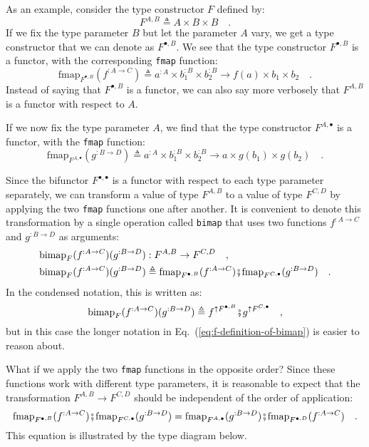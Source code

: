 As an example, consider the type constructor $F$ defined by:
\[
F^{A,B}\triangleq A\times B\times B\quad.
\]
If we fix the type parameter $B$ but let the parameter $A$ vary,
we get a type constructor that we can denote as $F^{\bullet,B}$.
We see that the type constructor $F^{\bullet,B}$ is a functor, with
the corresponding \lstinline!fmap! function:
\[
\text{fmap}_{F^{\bullet,B}}(f^{:A\rightarrow C})\triangleq a^{:A}\times b_{1}^{:B}\times b_{2}^{:B}\rightarrow f(a)\times b_{1}\times b_{2}\quad.
\]
Instead of saying that $F^{\bullet,B}$ is a functor, we can also
say more verbosely that $F^{A,B}$ is a functor with respect to $A$. 

If we now fix the type parameter $A$, we find that the type constructor
$F^{A,\bullet}$ is a functor, with the \lstinline!fmap! function:
\[
\text{fmap}_{F^{A,\bullet}}(g^{:B\rightarrow D})\triangleq a^{:A}\times b_{1}^{:B}\times b_{2}^{:B}\rightarrow a\times g(b_{1})\times g(b_{2})\quad.
\]

Since the bifunctor $F^{\bullet,\bullet}$ is a functor with respect
to each type parameter separately, we can transform a value of type
$F^{A,B}$ to a value of type $F^{C,D}$ by applying the two \lstinline!fmap!
functions one after another. It is convenient to denote this transformation
by a single operation called \lstinline!bimap! that uses two functions
$f^{:A\rightarrow C}$ and $g^{:B\rightarrow D}$ as arguments:
\begin{align}
\text{bimap}_{F}(f^{:A\rightarrow C})(g^{:B\rightarrow D}) & :F^{A,B}\rightarrow F^{C,D}\quad,\nonumber \\
\text{bimap}_{F}(f^{:A\rightarrow C})(g^{:B\rightarrow D}) & \triangleq\text{fmap}_{F^{\bullet,B}}(f^{:A\rightarrow C})\bef\text{fmap}_{F^{C,\bullet}}(g^{:B\rightarrow D})\quad.\label{eq:f-definition-of-bimap}
\end{align}
In the condensed notation, this is written as:
\[
\text{bimap}_{F}(f^{:A\rightarrow C})(g^{:B\rightarrow D})\triangleq f^{\uparrow F^{\bullet,B}}\bef g^{\uparrow F^{C,\bullet}}\quad,
\]
but in this case the longer notation in Eq.~(\ref{eq:f-definition-of-bimap})
is easier to reason about. 

What if we apply the two \lstinline!fmap! functions in the opposite
order? Since these functions work with different type parameters,
it is reasonable to expect that the transformation $F^{A,B}\rightarrow F^{C,D}$
should be independent of the order of application:
\begin{equation}
\text{fmap}_{F^{\bullet,B}}(f^{:A\rightarrow C})\bef\text{fmap}_{F^{C,\bullet}}(g^{:B\rightarrow D})=\text{fmap}_{F^{A,\bullet}}(g^{:B\rightarrow D})\bef\text{fmap}_{F^{\bullet,D}}(f^{:A\rightarrow C})\quad.\label{eq:f-fmap-fmap-bifunctor-commutativity}
\end{equation}
This equation is illustrated by the type diagram below.

